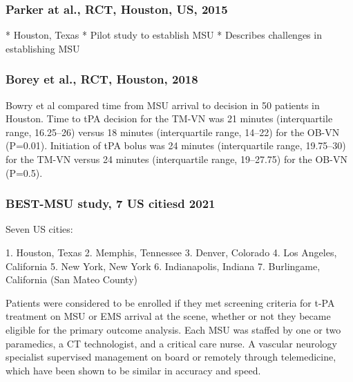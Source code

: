 \subsubsection{Parker at al., RCT, Houston, US, 2015 \cite{parker_establishing_2015}}

\begin{markdown}
* Houston, Texas
* Pilot study to establish MSU
* Describes challenges in establishing MSU
\end{markdown}

\subsubsection{Borey et al., RCT, Houston, 2018 \cite{bowry_time_2018}}

Bowry et al \cite{bowry_time_2018} compared time from MSU arrival to decision in 50 patients in Houston. Time to tPA decision for the TM-VN was 21 minutes (interquartile range, 16.25–26) versus 18 minutes (interquartile range, 14–22) for the OB-VN (P=0.01). Initiation of tPA bolus was 24 minutes (interquartile range, 19.75–30) for the TM-VN versus 24 minutes (interquartile range, 19–27.75) for the OB-VN (P=0.5).


\subsubsection{BEST-MSU study, 7 US citiesd 2021 \cite{grotta_prospective_2021}}

Seven US cities:

1. Houston, Texas
2. Memphis, Tennessee  
3. Denver, Colorado
4. Los Angeles, California
5. New York, New York
6. Indianapolis, Indiana
7. Burlingame, California (San Mateo County)

Patients were considered to be enrolled if they met screening criteria for t-PA treatment on MSU or EMS arrival at the scene, whether or not they became eligible for the primary outcome analysis. Each MSU was staffed by one or two paramedics, a CT technologist, and a critical care nurse. A vascular neurology specialist supervised management on board or remotely through telemedicine, which have been shown to be similar in accuracy and speed.

